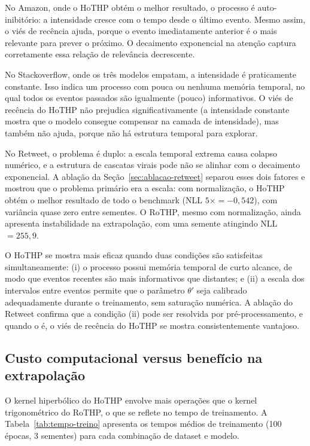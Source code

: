 No Amazon, onde o HoTHP obtém o melhor resultado, o processo é auto-inibitório: a intensidade cresce com o tempo desde o último evento. Mesmo assim, o viés de recência ajuda, porque o evento imediatamente anterior é o mais relevante para prever o próximo. O decaimento exponencial na atenção captura corretamente essa relação de relevância decrescente.

No Stackoverflow, onde os três modelos empatam, a intensidade é praticamente constante. Isso indica um processo com pouca ou nenhuma memória temporal, no qual todos os eventos passados são igualmente (pouco) informativos. O viés de recência do HoTHP não prejudica significativamente (a intensidade constante mostra que o modelo consegue compensar na camada de intensidade), mas também não ajuda, porque não há estrutura temporal para explorar.

No Retweet, o problema é duplo: a escala temporal extrema causa colapso numérico, e a estrutura de cascatas virais pode não se alinhar com o decaimento exponencial. A ablação da Seção~\ref{sec:ablacao-retweet} separou esses dois fatores e mostrou que o problema primário era a escala: com normalização, o HoTHP obtém o melhor resultado de todo o benchmark (NLL $5\times = -0{,}542$), com variância quase zero entre sementes. O RoTHP, mesmo com normalização, ainda apresenta instabilidade na extrapolação, com uma semente atingindo NLL $= 255{,}9$.

O HoTHP se mostra mais eficaz quando duas condições são satisfeitas simultaneamente: (i) o processo possui memória temporal de curto alcance, de modo que eventos recentes são mais informativos que distantes; e (ii) a escala dos intervalos entre eventos permite que o parâmetro $\theta'$ seja calibrado adequadamente durante o treinamento, sem saturação numérica. A ablação do Retweet confirma que a condição (ii) pode ser resolvida por pré-processamento, e quando o é, o viés de recência do HoTHP se mostra consistentemente vantajoso.

\subsection{Custo computacional versus benefício na extrapolação}
\label{subsec:custo-beneficio}

O kernel hiperbólico do HoTHP envolve mais operações que o kernel trigonométrico do RoTHP, o que se reflete no tempo de treinamento. A Tabela~\ref{tab:tempo-treino} apresenta os tempos médios de treinamento (100 épocas, 3 sementes) para cada combinação de dataset e modelo.

